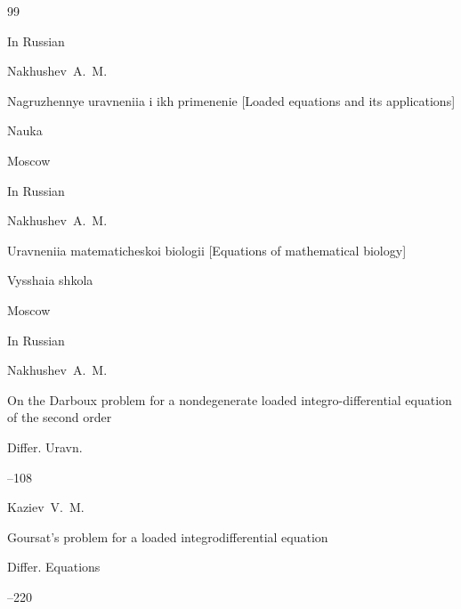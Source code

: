\begin{thebibliography}{99}




\lang In Russian

\by Nakhushev~A.~M.

\book Nagruzhennye uravneniia i ikh primenenie \rm [Loaded equations and its applications]


\publ Nauka

\publaddr Moscow







\lang In Russian

\by Nakhushev~A.~M.

\book Uravneniia matematicheskoi biologii \rm [Equations of mathematical biology]


\publ Vysshaia shkola

\publaddr Moscow







\lang In Russian

\by Nakhushev~A.~M.

\paper On the Darboux problem for a nondegenerate loaded integro-differential equation of the second order

\jour Differ. Uravn.




--108






\by Kaziev~V.~M.

\paper Goursat's problem for a loaded integrodifferential equation

\jour Differ. Equations 



--220 




\end{thebibliography}
